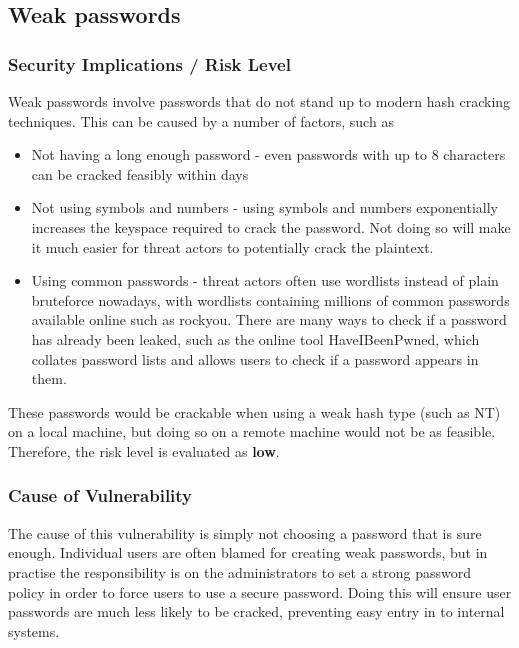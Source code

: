 \documentclass{report}
\begin{document}
\subsection{Weak passwords}
\subsubsection{Security Implications / Risk Level}
Weak passwords involve passwords that do not stand up to modern hash cracking techniques. This can be caused by a number of factors, such as
\begin{itemize}
	\item Not having a long enough password - even passwords with up to 8 characters can be cracked feasibly within days \cite{passwordcracking}
	\item Not using symbols and numbers - using symbols and numbers exponentially increases the keyspace required to crack the password. Not doing so will make it much easier for threat actors to potentially crack the plaintext.
	\item Using common passwords - threat actors often use wordlists instead of plain bruteforce nowadays, with wordlists containing millions of common passwords available online such as rockyou. There are many ways to check if a password has already been leaked, such as the online tool HaveIBeenPwned, which collates password lists and allows users to check if a password appears in them.
\end{itemize}
These passwords would be crackable when using a weak hash type (such as NT) on a local machine, but doing so on a remote machine would not be as feasible. Therefore, the risk level is evaluated as \textbf{low}.
\subsubsection{Cause of Vulnerability}
The cause of this vulnerability is simply not choosing a password that is sure enough. Individual users are often blamed for creating weak passwords, but in practise the responsibility is on the administrators to set a strong password policy in order to force users to use a secure password. Doing this will ensure user passwords are much less likely to be cracked, preventing easy entry in to internal systems.
\end{document}
